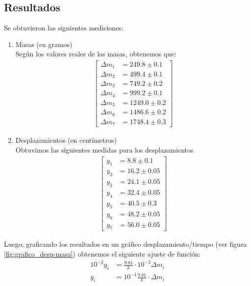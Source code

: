 \documentclass{article}
\begin{document}
\begin{multicols}{2}
\centering
    \section{Resultados}
\raggedright

Se obtuvieron las siguientes mediciones:

\begin{enumerate}[start=1, label={\bfseries \roman*})]
\item Masas (en gramos) \\
Según los valores reales de las masas, obtenemos que:
\begin{align*}
    \left[\begin{array}{cc}
         \Delta m_1 &= 249.8 \pm 0.1  \\
        \Delta m_2 &= 499.4 \pm 0.1\\
        \Delta m_3 &= 749.2 \pm 0.2\\
        \Delta m_4 &= 999.2 \pm 0.1\\
        \Delta m_5 &= 1249.0 \pm 0.2\\
        \Delta m_6 &= 1486.6 \pm 0.2\\
        \Delta m_7 &= 1748.4 \pm 0.3
    \end{array}\right]
\end{align*}
\item Desplazamientos (en centímetros)\\
Obtuvimos las siguientes medidas para los desplazamientos
\begin{align*}
    \left[\begin{array}{cc}
        y_1 &= 8.8 \pm 0.1\\
         y_2 &=  16.2 \pm 0.05\\
         y_3 &= 24.1\pm 0.05 \\
         y_4 &= 32.4 \pm 0.05\\
         y_5 &= 40.5 \pm 0.3\\
         y_6 &= 48.2 \pm 0.05\\
         y_7 &= 56.0\pm 0.05
    \end{array}\right]
\end{align*}
\end{enumerate}
Luego, graficando los resultados en un gráfico desplazamiento/tiempo (ver figura \ref{fig:grafico_desp-masa}) obtenemos el siguiente ajuste de función:
\begin{align*}
    10^{-2}y_i &= \frac{9.81}{k}\cdot 10^{-3}\Delta m_i\\
    y_i &= 10^{-1}\frac{9.81}{k}\cdot \Delta m_i \tag{S.I}

\end{align*}
\end{multicols}
\end{document}
